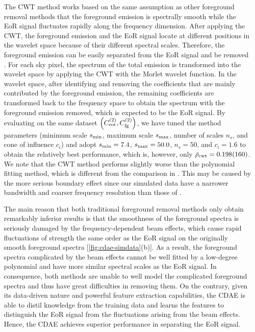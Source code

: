 The CWT method works based on the same assumption as other foreground
removal methods that the foreground emission is spectrally smooth while the
EoR signal fluctuates rapidly along the frequency dimension.
After applying the CWT, the foreground emission and the EoR signal locate
at different positions in the wavelet space because of their different
spectral scales.
Therefore, the foreground emission can be easily separated from the EoR
signal and be removed \cite{gu2013}.
For each sky pixel, the spectrum of the total emission is transformed into
the wavelet space by applying the CWT with the Morlet wavelet function.
In the wavelet space, after identifying and removing the coefficients that
are mainly contributed by the foreground emission, the remaining
coefficients are transformed back to the frequency space to obtain the
spectrum with the foreground emission removed, which is expected to be the
EoR signal.
By evaluating on the same dataset
$\left( C_{\mathrm{eor}}^{(2)}, C_{\mathrm{fg}}^{(2)} \right)$,
we have tuned the method parameters (minimum scale $s_{\mathrm{min}}$, maximum
scale $s_{\mathrm{max}}$, number of scales $n_s$, and cone of influence $c_i$)
and adopt $s_{\mathrm{min}} = 7.4$, $s_{\mathrm{max}} = 50.0$, $n_s = 50$, and
$c_i = 1.6$ to obtain the relatively best performance, which is, however,
only $\bar{\rho}_{\mathrm{cwt}} = \num{0.198 +- 0.160}$.
We note that the CWT method performs slightly worse than the polynomial
fitting method, which is different from the comparison in \citet{gu2013}.
This may be caused by the more serious boundary effect since our simulated
data have a narrower bandwidth and coarser frequency resolution than those
of \citet{gu2013}.

The main reason that both traditional foreground removal methods only
obtain remarkably inferior results is that the smoothness of the foreground
spectra is seriously damaged by the frequency-dependent beam effects, which
cause rapid fluctuations of strength the same order as the EoR signal on
the originally smooth foreground spectra [\autoref{fig:cdae-simdata}(b)].
As a result, the foreground spectra complicated by the beam effects cannot
be well fitted by a low-degree polynomial and have more similar spectral
scales as the EoR signal.
In consequence, both methods are unable to well model the complicated
foreground spectra and thus have great difficulties in removing them.
On the contrary, given its data-driven nature and powerful feature
extraction capabilities, the CDAE is able to distil knowledge from the
training data and learns the features to distinguish the EoR signal from
the fluctuations arising from the beam effects.
Hence, the CDAE achieves superior performance in separating the EoR signal.


